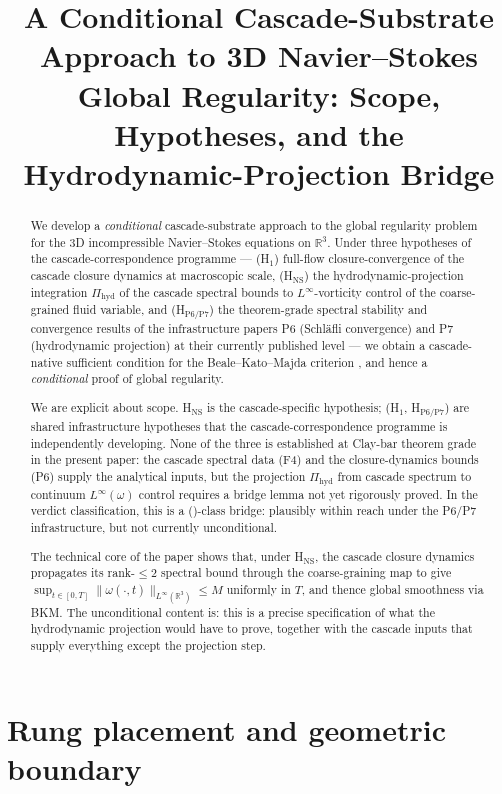 \documentclass[11pt, a4paper]{amsart}
\title{A Conditional Cascade-Substrate Approach to 3D Navier--Stokes Global Regularity: Scope, Hypotheses, and the Hydrodynamic-Projection Bridge}
\author{}
\date{}
\theoremstyle{definition}
\newcommand{\R}{\mathbb{R}}
\begin{document}
\maketitle

\begin{abstract}
We develop a \emph{conditional} cascade-substrate approach to the
global regularity problem for the 3D incompressible
Navier--Stokes equations on $\R^3$. Under three hypotheses of the
cascade-correspondence programme — (H$_1$) full-flow
closure-convergence of the cascade closure dynamics at macroscopic
scale, (H$_{\mathrm{NS}}$) the hydrodynamic-projection integration
$\Pi_{\mathrm{hyd}}$ of the cascade spectral bounds to
$L^\infty$-vorticity control of the coarse-grained fluid variable,
and (H$_{\text{P6/P7}}$) the theorem-grade spectral stability and
convergence results of the infrastructure papers P6 (Schl\"afli
convergence) and P7 (hydrodynamic projection) at their currently
published level — we obtain a cascade-native sufficient condition
for the Beale--Kato--Majda criterion \cite{BKM}, and hence a
\emph{conditional} proof of global regularity.

We are explicit about scope. H$_{\mathrm{NS}}$ is the
cascade-specific hypothesis; (H$_1$, H$_{\text{P6/P7}}$) are
shared infrastructure hypotheses that the cascade-correspondence
programme is independently developing. None of the three is
established at Clay-bar theorem grade in the present paper: the
cascade spectral data (F4) and the closure-dynamics bounds (P6)
supply the analytical inputs, but the projection
$\Pi_{\mathrm{hyd}}$ from cascade spectrum to continuum
$L^\infty(\omega)$ control requires a bridge lemma not yet
rigorously proved. In the verdict classification, this is a
(\textbeta)-class bridge: plausibly within reach under the P6/P7
infrastructure, but not currently unconditional.

The technical core of the paper shows that, under
H$_{\mathrm{NS}}$, the cascade closure dynamics propagates its
rank-$\leq 2$ spectral bound through the coarse-graining map to
give $\sup_{t \in [0,T]} \|\omega(\cdot, t)\|_{L^\infty(\R^3)} \leq M$
uniformly in $T$, and thence global smoothness via BKM. The
unconditional content is: this is a precise specification of what
the hydrodynamic projection would have to prove, together with
the cascade inputs that supply everything except the projection
step.
\end{abstract}

\tableofcontents

\section*{Rung placement and geometric boundary}
\end{document}
